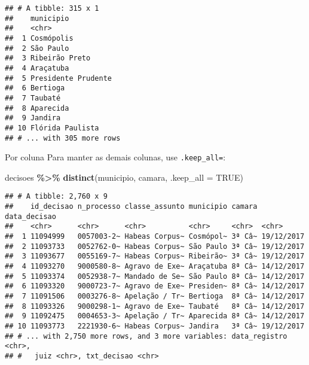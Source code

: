 \documentclass[
  10pt,
  ignorenonframetext,
]{beamer}
\newenvironment{Shaded}{\begin{snugshade}}{\end{snugshade}}
\newcommand{\DataTypeTok}[1]{\textcolor[rgb]{0.13,0.29,0.53}{#1}}
\newcommand{\KeywordTok}[1]{\textcolor[rgb]{0.13,0.29,0.53}{\textbf{#1}}}
\newcommand{\NormalTok}[1]{#1}
\newcommand{\OperatorTok}[1]{\textcolor[rgb]{0.81,0.36,0.00}{\textbf{#1}}}
\newcommand{\OtherTok}[1]{\textcolor[rgb]{0.56,0.35,0.01}{#1}}
\newcommand{\StringTok}[1]{\textcolor[rgb]{0.31,0.60,0.02}{#1}}
\begin{document}
\begin{frame}[fragile]{}
\protect\hypertarget{section-10}{}
\begin{verbatim}
## # A tibble: 315 x 1
##    municipio          
##    <chr>              
##  1 Cosmópolis         
##  2 São Paulo          
##  3 Ribeirão Preto     
##  4 Araçatuba          
##  5 Presidente Prudente
##  6 Bertioga           
##  7 Taubaté            
##  8 Aparecida          
##  9 Jandira            
## 10 Flórida Paulista   
## # ... with 305 more rows
\end{verbatim}
\end{frame}

\begin{frame}[fragile]{Por coluna}
\protect\hypertarget{por-coluna-1}{}
Para manter as demais colunas, use \texttt{.keep\_all=}:

\begin{Shaded}
\begin{Highlighting}[]
\NormalTok{decisoes }\OperatorTok{\%\textgreater{}\%}
\StringTok{  }\KeywordTok{distinct}\NormalTok{(municipio, camara, }
           \DataTypeTok{.keep\_all =} \OtherTok{TRUE}\NormalTok{)}
\end{Highlighting}
\end{Shaded}
\end{frame}

\begin{frame}[fragile]{}
\protect\hypertarget{section-11}{}
\begin{verbatim}
## # A tibble: 2,760 x 9
##    id_decisao n_processo classe_assunto municipio camara data_decisao
##    <chr>      <chr>      <chr>          <chr>     <chr>  <chr>       
##  1 11094999   0057003-2~ Habeas Corpus~ Cosmópol~ 3ª Câ~ 19/12/2017  
##  2 11093733   0052762-0~ Habeas Corpus~ São Paulo 3ª Câ~ 19/12/2017  
##  3 11093677   0055169-7~ Habeas Corpus~ Ribeirão~ 3ª Câ~ 19/12/2017  
##  4 11093270   9000580-8~ Agravo de Exe~ Araçatuba 8ª Câ~ 14/12/2017  
##  5 11093374   0052938-7~ Mandado de Se~ São Paulo 8ª Câ~ 14/12/2017  
##  6 11093320   9000723-7~ Agravo de Exe~ Presiden~ 8ª Câ~ 14/12/2017  
##  7 11091506   0003276-8~ Apelação / Tr~ Bertioga  8ª Câ~ 14/12/2017  
##  8 11093326   9000298-1~ Agravo de Exe~ Taubaté   8ª Câ~ 14/12/2017  
##  9 11092475   0004653-3~ Apelação / Tr~ Aparecida 8ª Câ~ 14/12/2017  
## 10 11093773   2221930-6~ Habeas Corpus~ Jandira   3ª Câ~ 19/12/2017  
## # ... with 2,750 more rows, and 3 more variables: data_registro <chr>,
## #   juiz <chr>, txt_decisao <chr>
\end{verbatim}
\end{frame}
\end{document}
